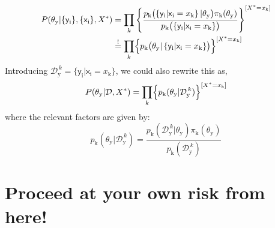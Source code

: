 \documentclass[]{report}
\begin{document}
\begin{align}
P( \theta_\mathrm{y} | \{ \mathsf{y}_\mathrm{i} \}, \{ \mathsf{x}_\mathrm{i} \}, X^*) 
&=
\prod_{k}
	\left\{
		\frac
			{
				p_\mathrm{k}
					\bigl(
						\left\{ 
							\mathsf{y}_\mathrm{i} | 
							\mathsf{x}_\mathrm{i} = x_\mathrm{k}
						\right\} |
						\theta_\mathrm{y}
					\bigr)
				\pi_\mathrm{k}( \theta_\mathrm{y} )
			}
			{
				p_\mathrm{k}
					\bigl(
						\left\{
							\mathsf{y}_\mathrm{i} | 
							\mathsf{x}_\mathrm{i} = x_\mathrm{k}
						\right\} 
					\bigr)
			}
	\right\}
	^
	{
		[ X^* = x_\mathrm{k} ]
	}
\nonumber \\
&\stackrel{!}{=}
\prod_{k}
	\Bigl\{
		p_\mathrm{k}
			\bigl(
				\theta_\mathrm{y} |
				\left\{
					\mathsf{y}_\mathrm{i} |
					\mathsf{x}_\mathrm{i} = x_\mathrm{k}
				\right\}
			\bigr)
	\Bigr\}
	^
	{
		[ X^* = x_\mathrm{k} ]
	} 
\end{align}
Introducing $\mathcal{D}_\mathrm{y}^{\,k} = \{ \mathsf{y}_\mathrm{i} | \mathsf{x}_\mathrm{i} = x_\mathrm{k} \} $, we could also rewrite this as,
\begin{equation}
P( \theta_\mathrm{y} | \mathcal{D}, X^* ) 
=
\prod_{k}
	\Bigl\{
		p_\mathrm{k}( \theta_\mathrm{y} | \mathcal{D}_\mathrm{y}^{\,k} )
	\Bigr\}
	^
	{
		[ X^* = x_\mathrm{k} ]
	}
\end{equation}
where the relevant factors are given by:
\begin{equation}
p_\mathrm{k}( \theta_\mathrm{y} | \mathcal{D}_\mathrm{y}^{\,k} ) 
=
\frac
	{
		p_\mathrm{k}( \mathcal{D}_\mathrm{y}^{\,k} | \theta_\mathrm{y} )
		\pi_\mathrm{k}( \theta_\mathrm{y} )
	}
	{
		p_\mathrm{k}( \mathcal{D}_\mathrm{y}^{\,k} )
	}
\end{equation}

\section*{Proceed at your own risk from here!}
\end{document}
